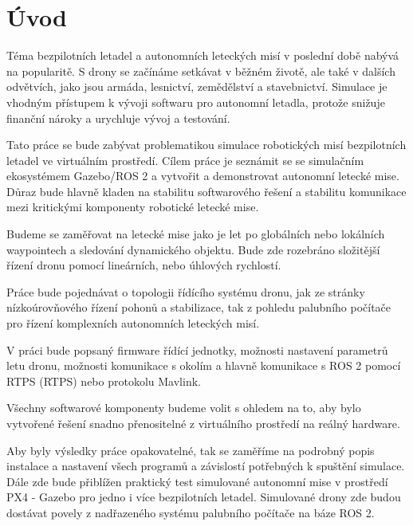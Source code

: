 \chapter*{Úvod}
{}

Téma bezpilotních letadel a autonomních leteckých misí v poslední době nabývá na popularitě. S drony se začínáme setkávat v běžném životě, ale také v dalších odvětvích, jako jsou armáda, lesnictví, zemědělství a stavebnictví. Simulace je vhodným přístupem k vývoji softwaru pro autonomní letadla, protože snižuje finanční nároky a urychluje vývoj a testování.

Tato práce se bude zabývat problematikou simulace robotických misí bezpilotních letadel ve virtuálním prostředí. Cílem práce je seznámit se se simulačním ekosystémem Gazebo/ROS 2 a vytvořit a demonstrovat autonomní letecké mise. Důraz bude hlavně kladen na stabilitu softwarového řešení a stabilitu komunikace mezi kritickými komponenty robotické letecké mise.

Budeme se zaměřovat na letecké mise jako je let po globálních nebo lokálních waypointech a sledování dynamického objektu. Bude zde rozebráno složitější řízení dronu pomocí lineárních, nebo úhlových rychlostí. 

Práce bude pojednávat o topologii řídícího systému dronu, jak ze stránky nízkoúrovňového řízení pohonů a stabilizace, tak z pohledu palubního počítače pro řízení komplexních autonomních leteckých misí.

V práci bude popsaný firmware řídící jednotky, možnosti nastavení parametrů letu dronu, možnosti komunikace s okolím a hlavně komunikace s ROS 2 pomocí \acs{RTPS} (\acl{RTPS}) nebo protokolu Mavlink.

Všechny softwarové komponenty budeme volit s ohledem na to, aby bylo vytvořené řešení snadno přenositelné z virtuálního prostředí na reálný hardware.

Aby byly výsledky práce opakovatelné, tak se zaměříme na podrobný popis instalace a nastavení všech programů a závislostí potřebných k spuštění simulace. Dále zde bude přiblížen praktický test simulované autonomní mise v prostředí PX4 - Gazebo pro jedno i více bezpilotních letadel. Simulované drony zde budou dostávat povely z nadřazeného systému palubního počítače na báze ROS 2.
